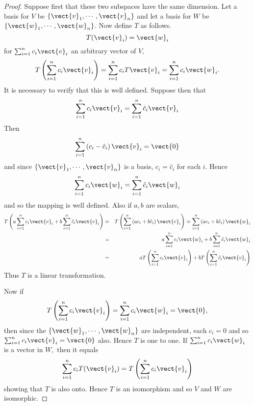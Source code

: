 \begin{proof} Suppose first that these two subspaces have the same
dimension. Let a basis for $V$ be $\left\{ 
\vect{v}_{1},\cdots ,\vect{v}_{n}\right\} $ and let a basis for $W$ be $
\left\{ \vect{w}_{1},\cdots ,\vect{w}_{n}\right\} $. Now define $T$ as
follows. 
\begin{equation*}
T(\vect{v}_{i})=\vect{w}_{i}
\end{equation*}
for $\sum_{i=1}^{n}c_{i}\vect{v}_{i}$ an arbitrary vector of $V,$
\begin{equation*}
T\left( \sum_{i=1}^{n}c_{i}\vect{v}_{i}\right) = \sum_{i=1}^{n}c_{i}T
\vect{v}_{i}=\sum_{i=1}^{n}c_{i}\vect{w}_{i}.
\end{equation*}
It is necessary to verify that this is well defined. Suppose then that 
\begin{equation*}
\sum_{i=1}^{n}c_{i}\vect{v}_{i}=\sum_{i=1}^{n}\hat{c}_{i}\vect{v}_{i}
\end{equation*}
Then 
\begin{equation*}
\sum_{i=1}^{n}\left( c_{i}-\hat{c}_{i}\right) \vect{v}_{i}=\vect{0}
\end{equation*}
and since $\left\{ \vect{v}_{1},\cdots ,\vect{v}_{n}\right\} $ is a basis, $
c_{i}=\hat{c}_{i}$ for each $i$. Hence 
\begin{equation*}
\sum_{i=1}^{n}c_{i}\vect{w}_{i}=\sum_{i=1}^{n}\hat{c}_{i}\vect{w}_{i}
\end{equation*}
and so the mapping is well defined. Also if $a,b$ are scalars, 
\begin{eqnarray*}
T\left( a\sum_{i=1}^{n}c_{i}\vect{v}_{i}+b\sum_{i=1}^{n}\hat{c}_{i}\vect{v}%
_{i}\right) &=&T\left( \sum_{i=1}^{n}\left( ac_{i}+b\hat{c}_{i}\right) \vect{v%
}_{i}\right) =\sum_{i=1}^{n}\left( ac_{i}+b\hat{c}_{i}\right) \vect{w}_{i} \\
&=&a\sum_{i=1}^{n}c_{i}\vect{w}_{i}+b\sum_{i=1}^{n}\hat{c}_{i}\vect{w}_{i} \\
&=&aT\left( \sum_{i=1}^{n}c_{i}\vect{v}_{i}\right) +bT\left( \sum_{i=1}^{n}%
\hat{c}_{i}\vect{v}_{i}\right)
\end{eqnarray*}
Thus $T$ is a linear transformation. 

Now if 
\begin{equation*}
T\left( \sum_{i=1}^{n}c_{i}\vect{v}_{i}\right) =\sum_{i=1}^{n}c_{i}\vect{w}%
_{i}=\vect{0},
\end{equation*}
then since the $\left\{ \vect{w}_{1},\cdots ,\vect{w}_{n}\right\} $ are
independent, each $c_{i}=0$ and so $\sum_{i=1}^{n}c_{i}\vect{v}_{i}=\vect{0}$
also. Hence $T$ is one to one. If $\sum_{i=1}^{n}c_{i}\vect{w}_{i}$ is a
vector in $W,$ then it equals 
\begin{equation*}
\sum_{i=1}^{n}c_{i}T(\vect{v}_{i})=T\left( \sum_{i=1}^{n}c_{i}\vect{v}_{i}\right)
\end{equation*}
showing that $T$ is also onto. Hence $T$ is an isomorphism and so $V$ and $W$
are isomorphic.


\end{proof}
